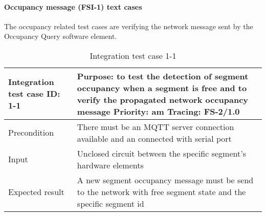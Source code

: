 \paragraph{Occupancy message (FSI-1) text cases} The occupancy related test cases are verifying the network message sent by the Occupancy Query software element.
\begin{table}[H]
	\caption{Integration test case 1-1}
	\label{table:TCase-FSI1-01}
	\begin{center}
		\renewcommand{\arraystretch}{1.8}
		\begin{tabu} 
			to 0.9 \textwidth
			{  X[0.3, l] X[l] }
			\toprule
			Integration test case ID: 1-1 & Purpose: to test the detection of segment occupancy when a segment is free and to verify the propagated network occupancy message \newline Priority: am \newline Tracing: FS-2/1.0 \\ \midrule
			Precondition                  & There must be an MQTT server connection available and an connected with serial port                                                                                                \\
			Input                         & Unclosed circuit between the specific segment's hardware elements                                                                                                                  \\
			Expected result               & A new segment occupancy message must be send to the network with free segment state  and the specific segment id                                                                   \\ \bottomrule
		\end{tabu}
	\end{center}
\end{table} 


